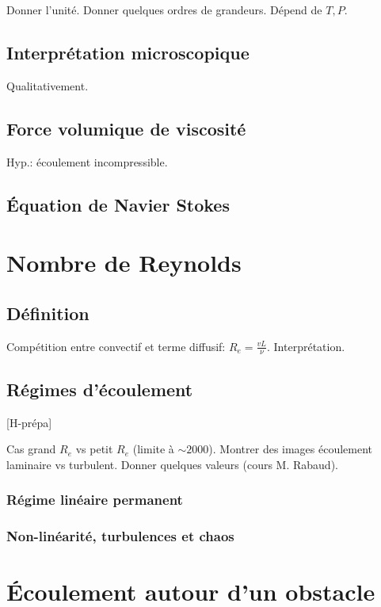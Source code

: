 \documentclass[11pt]{report}
\numberwithin{figure}{section}
\numberwithin{equation}{section}
\numberwithin{table}{section}
\newcommand{\1}{\boldsymbol{1}}
\begin{document}
Donner l'unité. Donner quelques ordres de grandeurs. Dépend de $T, P$.

\subsection{Interprétation microscopique}

Qualitativement.

\subsection{Force volumique de viscosité}

Hyp.: écoulement incompressible.


\subsection{Équation de Navier Stokes}



\section{Nombre de Reynolds}

\subsection{Définition}

Compétition entre convectif et terme diffusif: $R_e = \frac{v L}{\nu}$. Interprétation.

\subsection{Régimes d'écoulement}

[H-prépa]

Cas grand $R_e$ vs petit $R_e$ (limite à $\sim 2000$). Montrer des images écoulement laminaire vs turbulent. Donner quelques valeurs (cours M. Rabaud).

\subsubsection{Régime linéaire permanent}

\subsubsection{Non-linéarité, turbulences et chaos}

\section{Écoulement autour d'un obstacle}
\end{document}
